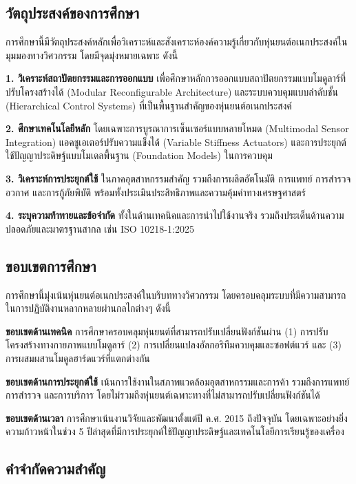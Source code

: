 \documentclass[a4paper]{article}
\begin{document}
\subsection{วัตถุประสงค์ของการศึกษา}

การศึกษานี้มีวัตถุประสงค์หลักเพื่อวิเคราะห์และสังเคราะห์องค์ความรู้เกี่ยวกับหุ่นยนต์อเนกประสงค์ในมุมมองทางวิศวกรรม โดยมีจุดมุ่งหมายเฉพาะ ดังนี้

\textbf{1. วิเคราะห์สถาปัตยกรรมและการออกแบบ} เพื่อศึกษาหลักการออกแบบสถาปัตยกรรมแบบโมดูลาร์ที่ปรับโครงสร้างได้ (Modular Reconfigurable Architecture) และระบบควบคุมแบบลำดับชั้น (Hierarchical Control Systems) ที่เป็นพื้นฐานสำคัญของหุ่นยนต์อเนกประสงค์ \parencite{tassi2024multimodal}

\textbf{2. ศึกษาเทคโนโลยีหลัก} โดยเฉพาะการบูรณาการเซ็นเซอร์แบบหลายโหมด (Multimodal Sensor Integration) \parencite{yang2024body} แอคชูเอเตอร์ปรับความแข็งได้ (Variable Stiffness Actuators) และการประยุกต์ใช้ปัญญาประดิษฐ์แบบโมเดลพื้นฐาน (Foundation Models) ในการควบคุม

\textbf{3. วิเคราะห์การประยุกต์ใช้} ในภาคอุตสาหกรรมสำคัญ รวมถึงการผลิตอัตโนมัติ การแพทย์ การสำรวจอวกาศ และการกู้ภัยพิบัติ พร้อมทั้งประเมินประสิทธิภาพและความคุ้มค่าทางเศรษฐศาสตร์

\textbf{4. ระบุความท้าทายและข้อจำกัด} ทั้งในด้านเทคนิคและการนำไปใช้งานจริง รวมถึงประเด็นด้านความปลอดภัยและมาตรฐานสากล เช่น ISO 10218-1:2025 \parencite{iso2025robotics}

\subsection{ขอบเขตการศึกษา}

การศึกษานี้มุ่งเน้นหุ่นยนต์อเนกประสงค์ในบริบททางวิศวกรรม โดยครอบคลุมระบบที่มีความสามารถในการปฏิบัติงานหลากหลายผ่านกลไกต่างๆ ดังนี้

\textbf{ขอบเขตด้านเทคนิค} การศึกษาครอบคลุมหุ่นยนต์ที่สามารถปรับเปลี่ยนฟังก์ชันผ่าน (1) การปรับโครงสร้างทางกายภาพแบบโมดูลาร์ (2) การเปลี่ยนแปลงอัลกอริทึมควบคุมและซอฟต์แวร์ และ (3) การผสมผสานโมดูลฮาร์ดแวร์ที่แตกต่างกัน

\textbf{ขอบเขตด้านการประยุกต์ใช้} เน้นการใช้งานในสภาพแวดล้อมอุตสาหกรรมและการค้า รวมถึงการแพทย์ การสำรวจ และการบริการ โดยไม่รวมถึงหุ่นยนต์เฉพาะทางที่ไม่สามารถปรับเปลี่ยนฟังก์ชันได้

\textbf{ขอบเขตด้านเวลา} การศึกษาเน้นงานวิจัยและพัฒนาตั้งแต่ปี ค.ศ. 2015 ถึงปัจจุบัน โดยเฉพาะอย่างยิ่งความก้าวหน้าในช่วง 5 ปีล่าสุดที่มีการประยุกต์ใช้ปัญญาประดิษฐ์และเทคโนโลยีการเรียนรู้ของเครื่อง

\subsection{คำจำกัดความสำคัญ}
\end{document}
